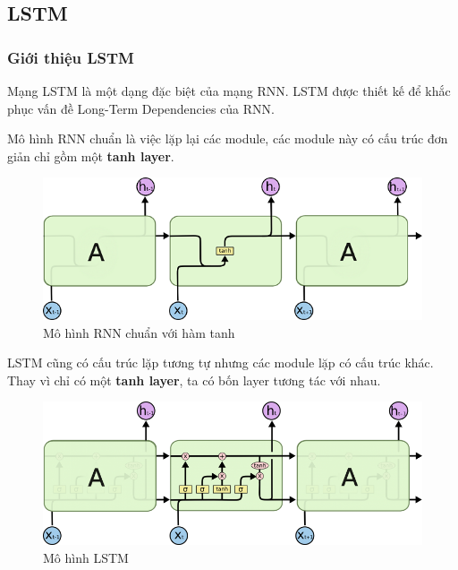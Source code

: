 \documentclass[a4paper,12pt]{report}
\begin{document}
\subsection{LSTM}
\subsubsection{Giới thiệu LSTM}
Mạng LSTM là một dạng đặc biệt của mạng RNN. LSTM được thiết kế để khắc phục vấn đề Long-Term Dependencies của RNN. 
\par Mô hình RNN chuẩn là việc lặp lại các module, các module này có cấu trúc đơn giản chỉ gồm một \textbf{tanh layer}.
\begin{figure}[H]
\centering
\includegraphics[scale=0.7]{rnn_tanh.jpg}
\caption{Mô hình RNN chuẩn với hàm tanh}
\end{figure}
\par LSTM cũng có cấu trúc lặp tương tự nhưng các module lặp có cấu trúc khác. Thay vì chỉ có một \textbf{tanh layer}, ta có bốn layer tương tác với nhau. 
\begin{figure}[H]
\centering
\includegraphics[scale=0.4]{lstm.png}
\caption{Mô hình LSTM}
\end{figure} 
\end{document}
